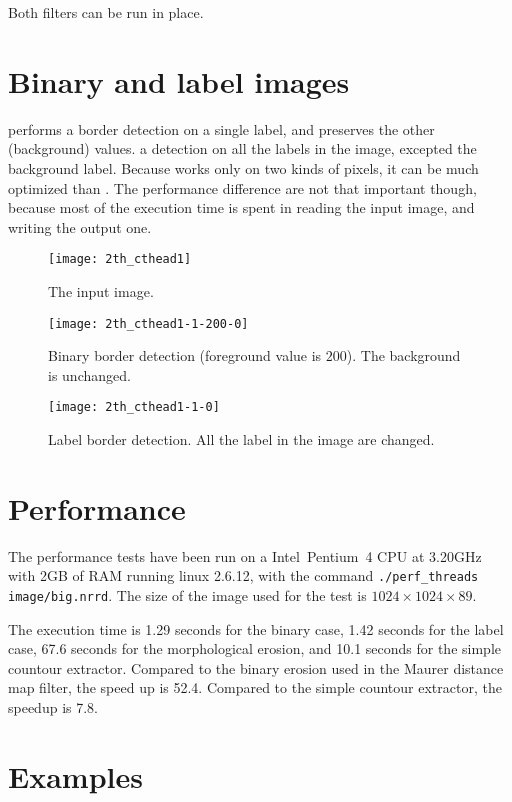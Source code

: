 \documentclass{InsightArticle}
\begin{document}
Both filters can be run in place.

\section{Binary and label images}  performs a border detection on a single label, and preserves the other (background) values.  a detection on all the labels in the image, excepted the background label. Because  works only on two kinds of pixels, it can be much optimized than . The performance difference are not that important though, because most of the execution time is spent in reading the input image, and writing the output one.

\begin{figure}[htbp]
\centering
\texttt{[image: 2th\_cthead1]}
\caption{The input image.\label{cthead1}}
\end{figure}

\begin{figure}[htbp]
\centering
\texttt{[image: 2th\_cthead1-1-200-0]}
\caption{Binary border detection (foreground value is $200$). The background is unchanged.\label{cthead1-bin}}
\end{figure}

\begin{figure}[htbp]
\centering
\texttt{[image: 2th\_cthead1-1-0]}
\caption{Label border detection. All the label in the image are changed.\label{cthead1-label}}
\end{figure}

\section{Performance}

The performance tests have been run on a Intel\circledR~Pentium\circledR~4 CPU at 3.20GHz with 2GB of RAM running linux 2.6.12, with the command \verb$./perf_threads image/big.nrrd$. The size of the image used for the test is $1024 \times 1024 \times 89$.

The execution time is 1.29 seconds for the binary case, 1.42 seconds for the label case, 67.6 seconds for the morphological erosion, and 10.1 seconds for the simple countour extractor. Compared to the binary erosion used in the Maurer distance map filter, the speed up is 52.4. Compared to the simple countour extractor, the speedup is 7.8.

\section{Examples}
\end{document}

